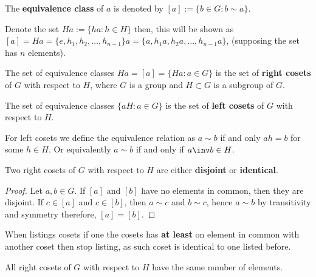 \documentclass[12pt, a4paper]{article}
\begin{document}
\begin{definition}
    The \textbf{equivalence class} of \(a\) is denoted by \([a]:= \{b \in G: b\sim a\}.\)
\end{definition}

Denote the set \(Ha:=\{ha: h \in H\}\) then, this will be shown as \([a]=Ha = \{e,h_1,h_2,\ldots, h_{n-1}\}a =\{a,h_1a,h_2a,\ldots,h_{n-1}a\}\), (supposing the set has \(n\) elements).

\begin{definition}
    The set of equivalence classes \(Ha = [a]=\{Ha: a\in G\}\) is the set of \textbf{right cosets} of \(G\) with respect to \(H\), where \(G\) is a group and \(H \subset G\) is a subgroup of \(G\).
\end{definition}

\begin{definition}
    The set of equivalence classes \(\{aH : a \in G\}\) is the set of \textbf{left cosets} of \(G\) with respect to \(H\).
\end{definition}

\begin{mdremark}
    For left cosets we define the equivalence relation as \(a\sim b\) if and only \(ah=b\) for some \(h\in H\). Or equivalently \(a\sim b\) if and only if \(a\inv b \in H\).
\end{mdremark}

\begin{theorem}
    Two right cosets of \(G\) with respect to \(H\) are either \textbf{disjoint} or \textbf{identical}.
\end{theorem}

\begin{proof}
    Let \(a,b \in G\). If \([a]\) and \([b]\) have no elements in common, then they are disjoint. If \(c \in [a]\) and \(c \in [b]\), then \(a\sim c\) and \(b\sim c\), hence \(a\sim b\) by transitivity and symmetry therefore, \([a]=[b]\).
\end{proof}

\begin{mdnote}
    When listings cosets if one the cosets has \textbf{at least} on element in common with another coset then stop listing, as such coset is identical to one listed before.
\end{mdnote}

\begin{theorem}
    All right cosets of \(G\) with respect to \(H\) have the same number of elements.
\end{theorem}
\end{document}
